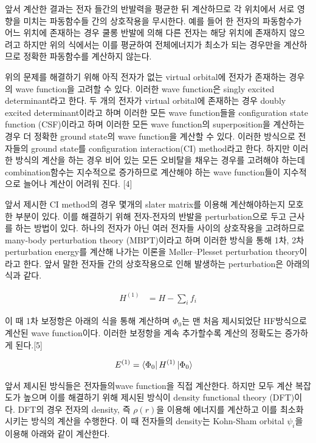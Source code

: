 \documentclass[%
 reprint,
 amsmath,amssymb,
 aps,
]{revtex4-2}
\begin{document}
앞서 계산한 결과는 전자 들간의 반발력을 평균한 뒤 계산하므로 각 위치에서 서로 영향을 미치는 파동함수들 간의 상호작용을 무시한다. 예를 들어 한 전자의 파동함수가 어느 위치에 존재하는 경우 쿨롱 반발에 의해 다른 전자는 해당 위치에 존재하지 않으려고 하지만 위의 식에서는 이를 평균하여 전체에너지가 최소가 되는 경우만을 계산하므로 정확한 파동함수를 계산하지 않는다.

위의 문제를 해결하기 위해 아직 전자가 없는 virtual orbital에 전자가 존재하는 경우의 wave function을 고려할 수 있다. 이러한 wave function은 singly excited determinant라고 한다. 두 개의 전자가 virtual orbital에 존재하는 경우 doubly excited determinant이라고 하며 이러한 모든 wave function들을 configuration state function (CSF)이라고 하며 이러한 모든 wave function의 superposition을 계산하는 경우 더 정확한 ground state의 wave function을 계산할 수 있다. 이러한 방식으로 전자들의 ground state를 configuration interaction(CI) method라고 한다. 하지만 이러한 방식의 계산을 하는 경우 비어 있는 모든 오비탈을 채우는 경우를 고려해야 하는데 combination함수는 지수적으로 증가하므로 계산해야 하는 wave function들이 지수적으로 늘어나 계산이 어려워 진다. [4]

앞서 제시한 CI method의 경우 몇개의 slater matrix를 이용해 계산해야하는지 모호한 부분이 있다. 이를 해결하기 위해 전자-전자의 반발을 perturbation으로 두고 근사를 하는 방법이 있다. 하나의 전자가 아닌 여러 전자들 사이의 상호작용을 고려하므로 many-body perturbation theory (MBPT)이라고 하며 이러한 방식을 통해 1차, 2차 perturbation energy를 계산해 나가는 이론을 Møller–Plesset perturbation theory이라고 한다. 앞서 말한 전자들 간의 상호작용으로 인해 발생하는 perturbation은 아래의 식과 같다.

\begin{align}
	H^{(1)} &= H - \sum_{i}f_{i}
\end{align}

이 때 1차 보정항은 아래의 식을 통해 계산하며 $\Phi_{0}$는 맨 처음 제시되었단 HF방식으로 계산된 wave function이다. 이러한 보정항을 계속 추가할수록 계산의 정확도는 증가하게 된다.[5]

\begin{align}
	E^{(1)} &= \bra{\Phi_{0}}H^{(1)}\ket{\Phi_{0}}
\end{align}

앞서 제시된 방식들은 전자들의wave function을 직접 계산한다. 하지만 모두 계산 복잡도가 높으며 이를 해결하기 위해 제시된 방식이 density functional theory (DFT)이다. DFT의 경우 전자의 density, 즉 $\rho(r)$을 이용해 에너지를 계산하고 이를 최소화시키는 방식의 계산을 수행한다. 이 때 전자들의 density는 Kohn-Sham orbital $\psi_{i}$을 이용해 아래와 같이 계산한다.
\end{document}
